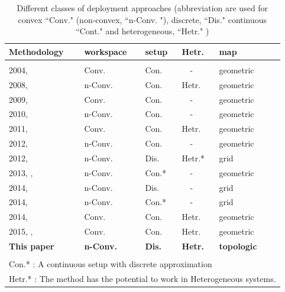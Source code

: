 \documentclass[smallcondensed]{svjour3}
\begin{document}
\begin{table}[t]
\centering
\caption{Different classes of deployment approaches (abbreviation are used for convex ``Conv." (non-convex, ``n-Conv. "), discrete, ``Dis." continuous ``Cont." and heterogeneous, ``Hetr." )   }
\label{tbl:classification}
\begin{tabular}{m{1.8cm}m{1.2cm}m{0.8cm}m{0.55cm}m{0.55cm}c}
Methodology                  	      & workspace        & setup 	& Hetr. & map    \\
 \hline
 \\
 2004, \cite{Cortes2004}      		 & Conv.     	    & Con.  	&	 ~~- & geometric	\\
 2008, \cite{Pimenta2008}            &n-Conv.           & Con.  	& Hetr.& geometric \\
 2009, \cite{Schwager2009}    		 & Conv.    	    & Con.		&  ~~- & geometric   \\
 2010, \cite{Breitenmoser2010} 		 & n-Conv.	        & Con.   	&  ~~- & geometric	\\
 2011, \cite{Stergi2011}    	     & Conv.  	        & Con. 	 	& Hetr.& geometric \\
 2012, \cite{Mahboubi2012}     		 & n-Conv. 		    & Con. 		&  ~~-   & geometric \\
 2012, \cite{Durham2012}	  		 & n-Conv. 	        & Dis. 		& Hetr.*& grid\\
 2013, \cite{Bhattacharya2013IJRR},\cite{Bhattacharya2013a}	& n-Conv. & Con.*    	&  ~~- 	& geometric\\
 2014, \cite{Yun2013}        		 & n-Conv.		    & Dis. 		&   ~~-  	& grid \\
 2014, \cite{reza2014} 		  		 & n-Conv. 		   & Con.*    &  ~~- 	& grid\\
 2014, \cite{Sharifi2014}  	  		 & Conv. 	  	   & Con.       &  Hetr. 	& geometric\\
 2015, \cite{Sharifi2015},\cite{Pierson2015}  	  	    & Conv. 	   & Con.       &  Hetr. & geometric\\
\textbf{This paper}				  		 &\textbf{n-Conv.}	     & \textbf{Dis.}       &  \textbf{Hetr.} & \textbf{topologic}\\
 \hline
 \\
 \multicolumn{6}{m{8cm}}{ Con.* : A continuous setup with discrete approximation}\\
 \multicolumn{6}{m{8cm}}{ Hetr.* : The method has the potential to work in Heterogeneous systems.}
\end{tabular}
\end{table}
%
\end{document}
